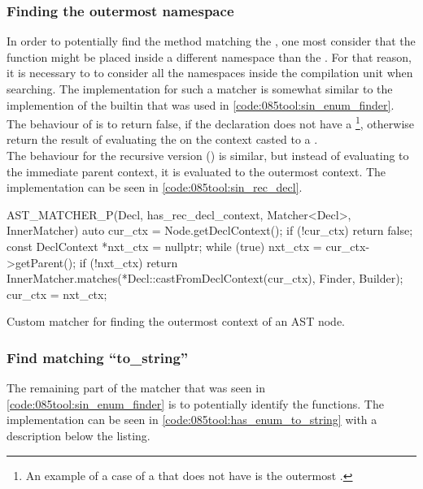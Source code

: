 \subsubsection*{Finding the outermost namespace}
In order to potentially find the  method matching the , one most consider that the function might be placed inside a different namespace than the .
For that reason, it is necessary to to consider all the namespaces inside the compilation unit when searching.
The implementation for such a matcher is somewhat similar to the implemention of the builtin  that was used in \cref{code:085tool:sin_enum_finder}. 
The behaviour of  is to return false, if the declaration does not have a \footnote{
    An example of a case of a  that does not have  is the outermost .
}, otherwise return the result of evaluating the  on the context casted to a .\\
The behaviour for the recursive version () is similar, but instead of evaluating to the immediate parent context, it is evaluated to the outermost context. The implementation can be seen in \cref{code:085tool:sin_rec_decl}.

\begin{listing}[H]
    \begin{cppcode}
AST_MATCHER_P(Decl, has_rec_decl_context, Matcher<Decl>, InnerMatcher) {
	auto cur_ctx = Node.getDeclContext();
	if (!cur_ctx) {
		return false;
	}
	const DeclContext *nxt_ctx = nullptr;
	while (true) {
		nxt_ctx = cur_ctx->getParent();
		if (!nxt_ctx) {
			return InnerMatcher.matches(*Decl::castFromDeclContext(cur_ctx), Finder, Builder);
		}
		cur_ctx = nxt_ctx;
	}
}
    \end{cppcode}
    \caption{Custom matcher for finding the outermost context of an AST node.}
    \label{code:085tool:sin_rec_decl}
\end{listing}

\subsubsection*{Find matching ``to\_string''}
The remaining part of the  matcher that was seen in \cref{code:085tool:sin_enum_finder} is to potentially identify the  functions. The implementation can be seen in \cref{code:085tool:has_enum_to_string} with a description below the listing.

